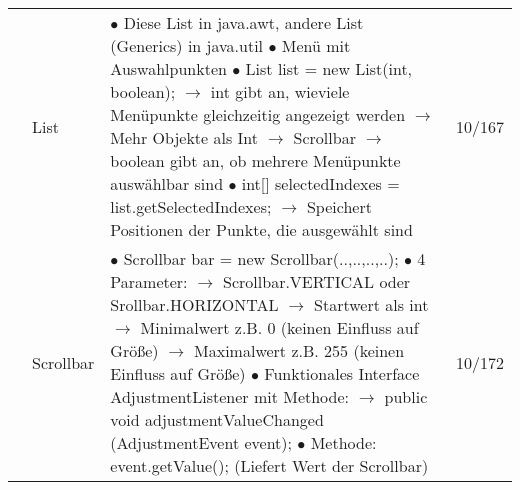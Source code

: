\documentclass[11pt,a4paper]{article}
\begin{document}
\begin{center}
\begin{longtable}[h]{ | p{2.3cm} | p{2.3cm} | p{12.6cm} | p{1.2cm} | }
	& List & \makecell[l]{$\bullet$ Diese List in java.awt, andere List (Generics) in java.util \\
	$\bullet$ Menü mit Auswahlpunkten \\ 
	$\bullet$ List list = new List(int, boolean); \\
	\hspace{0.4cm} $\rightarrow$ int gibt an, wieviele Menüpunkte gleichzeitig angezeigt werden \\
	\hspace{0.4cm} $\rightarrow$ Mehr Objekte als Int $\rightarrow$ Scrollbar \\
	\hspace{0.4cm} $\rightarrow$ boolean gibt an, ob mehrere Menüpunkte auswählbar sind \\
	$\bullet$ int[] selectedIndexes = list.getSelectedIndexes; \\
	\hspace{0.4cm} $\rightarrow$ Speichert Positionen der Punkte, die ausgewählt sind }  & 10/167 \\ \cline{2-4}
	
	& Scrollbar & \makecell[l]{$\bullet$ Scrollbar bar = new Scrollbar(..,..,..,..); \\
	$\bullet$ 4 Parameter: \\
	\hspace{0.4cm} $\rightarrow$ Scrollbar.VERTICAL oder Srollbar.HORIZONTAL \\
	\hspace{0.4cm} $\rightarrow$ Startwert als int \\
	\hspace{0.4cm} $\rightarrow$ Minimalwert z.B. 0 (keinen Einfluss auf Größe) \\
	\hspace{0.4cm} $\rightarrow$ Maximalwert z.B. 255 (keinen Einfluss auf Größe) \\
	$\bullet$ Funktionales Interface AdjustmentListener mit Methode: \\
	\hspace{0.4cm} $\rightarrow$ public void adjustmentValueChanged (AdjustmentEvent event); \\
	$\bullet$ Methode: event.getValue(); (Liefert Wert der Scrollbar) }  & 10/172 \\ \cline{2-4}
	

\end{longtable}
\end{center}
\end{document}
